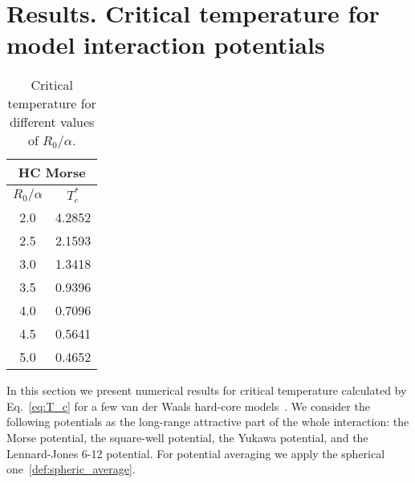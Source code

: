 \section{\label{sec:results}Results. Critical temperature for model interaction potentials}

\begin{table}[h]
	\caption{Critical temperature for different values of $R_0/\alpha$.}
	\begin{center}
		\begin{tabular}{|c|c|}
			\hline
			\multicolumn{2}{|c|}{HC Morse} \\
			\hline
			$R_0/\alpha$ \quad & $T_c^*$ \\
			\hline
			2.0  & 4.2852 \\
			2.5  & 2.1593 \\
			3.0  & 1.3418 \\
			3.5  & 0.9396 \\
			4.0  & 0.7096 \\
			4.5  & 0.5641 \\
			5.0  & 0.4652 \\
			\hline
		\end{tabular}
	\end{center}
	\label{tab:morse_temp_cr}
\end{table}

In this section we present numerical results for critical temperature calculated by Eq.~\eqref{eq:T_c} for a few van der Waals hard-core models~\cite{KreiciNezbeda2012}. We consider the following potentials as the long-range attractive part of the whole interaction: the Morse potential, the square-well potential, the Yukawa potential, and the Lennard-Jones 6-12 potential. For potential averaging we apply the spherical one~\eqref{def:spheric_average}.

